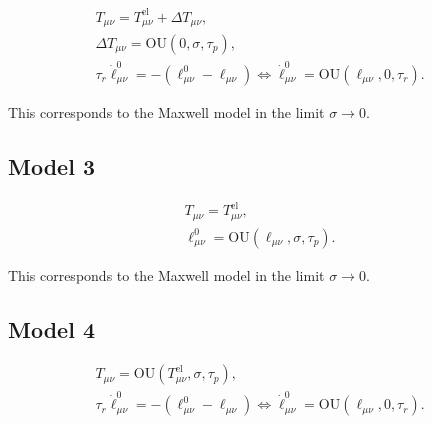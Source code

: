 \documentclass[aps, superscriptaddress, notitlepage, longbibliography]{revtex4-1}
\begin{document}
\begin{subequations}
\begin{align}
T_{\mu\nu} = T_{\mu\nu}^{\mathrm{el}} + \Delta T_{\mu\nu},\\
\Delta T_{\mu\nu} = \mathrm{OU}(0, \sigma, \tau_p),\\
\tau_r \dot{\ell}^0_{\mu\nu} = -(\ell^0_{\mu\nu} - \ell_{\mu\nu}) \Leftrightarrow \dot{\ell}^0_{\mu\nu} = \mathrm{OU}(\ell_{\mu\nu}, 0, \tau_r).
\end{align}
\end{subequations}

This corresponds to the Maxwell model in the limit $\sigma \to 0$.

\subsection{Model 3}

\begin{subequations}
\begin{align}
T_{\mu\nu} = T_{\mu\nu}^{\mathrm{el}},\\
\ell^0_{\mu\nu} = \mathrm{OU}(\ell_{\mu\nu}, \sigma, \tau_p).
\end{align}
\end{subequations}

This corresponds to the Maxwell model in the limit $\sigma \to 0$.

\subsection{Model 4}

\begin{subequations}
\begin{align}
T_{\mu\nu} = \mathrm{OU}(T_{\mu\nu}^{\mathrm{el}}, \sigma, \tau_p),\\
\tau_r \dot{\ell}^0_{\mu\nu} = -(\ell^0_{\mu\nu} - \ell_{\mu\nu}) \Leftrightarrow \dot{\ell}^0_{\mu\nu} = \mathrm{OU}(\ell_{\mu\nu}, 0, \tau_r).
\end{align}
\end{subequations}
\end{document}

